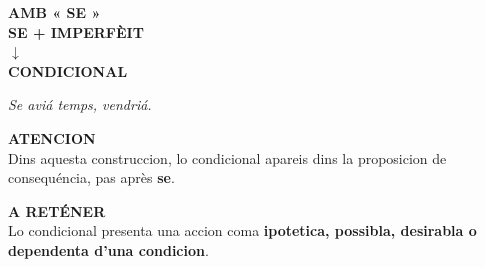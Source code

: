 \documentclass[a4paper,11pt]{article}
\begin{document}
\begin{minipage}{.91\textwidth}
\vspace{2mm}
\begin{minipage}{.485\textwidth}\begin{violetbox}[height=3.15cm]
\textbf{\color{VioletDark}AMB « SE »}\\[1mm]\centering
\textbf{SE + IMPERFÈIT}\\
$\downarrow$\\
\textbf{CONDICIONAL}\\[1mm]\raggedright
\textit{Se aviá temps, vendriá.}
\end{violetbox}\end{minipage}\hfill
\begin{minipage}{.485\textwidth}\begin{warnbox}[height=3.15cm]
\textbf{\color{Red}ATENCION}\\[1mm]
Dins aquesta construccion, lo condicional apareis dins la proposicion de consequéncia, pas après \textbf{se}.
\end{warnbox}\end{minipage}
\vspace{2mm}\begin{violetbox}\textbf{\color{VioletDark}A RETÉNER}\\[1mm]
Lo condicional presenta una accion coma \textbf{ipotetica, possibla, desirabla o dependenta d'una condicion}.
\end{violetbox}
\vspace{1.5mm}
\end{minipage}
\end{document}
